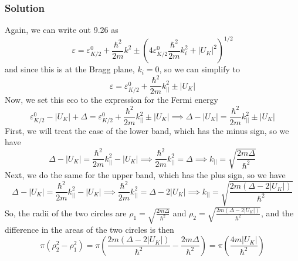 \documentclass[12pt]{article}
\begin{document}
\subsubsection{Solution}
Again, we can write out 9.26 as
\begin{equation}
    \varepsilon = \varepsilon_{K/2}^0 + \frac{\hbar^2}{2m}k^2 \pm \left(4\varepsilon_{K/2}^0\frac{\hbar^2}{2m}k_i^2 + |U_K|^2\right)^{1/2}
\end{equation}
and since this is at the Bragg plane, $k_i = 0$, so we can simplify to
\begin{equation}
    \varepsilon = \varepsilon_{K/2}^0 + \frac{\hbar^2}{2m}k_{||}^2 \pm |U_K|
\end{equation}
Now, we set this eco to the expression for the Fermi energy
\begin{equation}
    \varepsilon_{K/2}^0 - |U_K| + \Delta = \varepsilon_{K/2}^0 + \frac{\hbar^2}{2m}k_{||}^2 \pm |U_K| \implies \Delta  - |U_K| = \frac{\hbar^2}{2m}k_{||}^2 \pm |U_K|
\end{equation}
First, we will treat the case of the lower band, which has the minus sign, so we have
\begin{equation}
    \Delta - |U_K| = \frac{\hbar^2}{2m}k_{||}^2 - |U_K| \implies \frac{\hbar^2}{2m}k_{||}^2 = \Delta \implies k_{||} = \sqrt{\frac{2m\Delta}{\hbar^2}}
\end{equation}
Next, we do the same for the upper band, which has the plus sign, so we have
\begin{equation}
    \Delta - |U_K| = \frac{\hbar^2}{2m}k_{||}^2 - |U_K| \implies \frac{\hbar^2}{2m}k_{||}^2 = \Delta - 2|U_K| \implies k_{||} = \sqrt{\frac{2m(\Delta - 2|U_K|)}{\hbar^2}}
\end{equation}
So, the radii of the two circles are $\rho_1 = \sqrt{\frac{2m\Delta}{\hbar^2}}$ and $\rho_2 = \sqrt{\frac{2m(\Delta - 2|U_K|)}{\hbar^2}}$, and the difference in the areas of the two circles is then
\begin{equation}
    \pi(\rho_2^2 - \rho_1^2) = \pi\left(\frac{2m(\Delta - 2|U_K|)}{\hbar^2} - \frac{2m\Delta}{\hbar^2}\right) = \pi\left(\frac{4m|U_K|}{\hbar^2}\right)
\end{equation}
\end{document}
